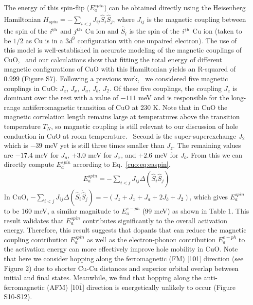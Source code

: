 The energy of this spin-flip ($E_a^{spin}$) can be obtained directly using the Heisenberg Hamiltonian $H_{spin}=-\sum_{i<j}J_{ij}\hat{S}_i\dot \hat{S}_j$, where $J_{ij}$ is the magnetic coupling between the spin of the $i^{\rm th}$ and $j^{\rm th}$ Cu ion and $\hat{S}_i$ is the spin of the $i^{\rm th}$ Cu ion (taken to be $1/2$ as Cu is in a $3d^9$ configuration with one unpaired electron). The use of this model is well-established in accurate modeling of the magnetic couplings of CuO,~\cite{rocquefelte2010short,rocquefelte2012theoretical,rocquefelte2013room} and our calculations show that fitting the total energy of different magnetic configurations of CuO with this Hamiltonian yields an R-squared of 0.999 (Figure S7). Following a previous work,~\cite{rocquefelte2010short} we considered five magnetic couplings in CuO: $J_z$, $J_x$, $J_a$, $J_b$, $J_2$. Of these five couplings, the coupling $J_z$ is dominant over the rest with a value of $-111$ meV and is responsible for the long-range antiferromagnetic transition of CuO at 230 K. Note that in CuO the magnetic correlation length remains large at temperatures above the transition temperature $T_N$, so magnetic coupling is still relevant to our discussion of hole conduction in CuO at room temperature.~\cite{zheng2001evidence,yang1989magnetic}
Second is the super-superexchange $J_2$ which is $-39$ meV yet is still three times smaller than $J_z$. The remaining values are $-17.4$ meV for $J_a$, $+3.0$ meV for $J_x$, and $+2.6$ meV for $J_b$. From this we can directly compute $E_a^{spin}$ according to Eq.~\ref{cuo:eq:easpin}.
\begin{align}
    E_a^{spin} = -\sum_{i<j}J_{ij} \Delta \left(\hat{S}_i\dot \hat{S}_j\right)
    \label{cuo:eq:easpin}
\end{align}
In CuO, $-\sum_{i<j}J_{ij} \Delta \left(\hat{S}_i\dot \hat{S}_j\right) = -(J_z+J_x+J_a+2J_b+J_2)$, which gives $E_a^{spin}$ to be 160 meV, a similar magnitude to $E_a^{e-ph}$ (99 meV) as shown in Table 1. This result validates that $E_a^{spin}$ contributes significantly to the overall activation energy. Therefore, this result suggests that dopants that can reduce the magnetic coupling contribution $E_a^{spin}$ as well as the electron-phonon contribution $E_a^{e-ph}$ to the activation energy can more effectively improve hole mobility in CuO.
Note that here we consider hopping along the ferromagnetic (FM) [101] direction (see Figure 2) due to shorter Cu-Cu distances and superior orbital overlap between initial and final states. Meanwhile, we find that hopping along the anti-ferromagnetic (AFM) [10$\bar{1}$] direction is energetically unlikely to occur (Figure S10-S12).


